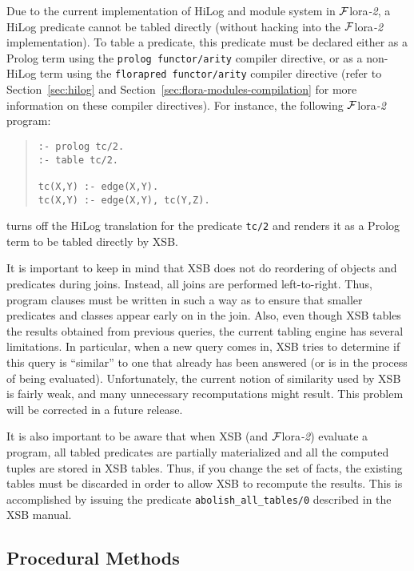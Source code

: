\documentclass[11pt]{article}
\newcommand{\FLORA}{{\mbox{${\cal F}${\sc lora}\rm\emph{-2}}}\xspace}
\begin{document}
%
Due to the current implementation of HiLog and module system in \FLORA,
a HiLog predicate cannot be tabled directly (without hacking into the
\FLORA implementation). To table a predicate, this predicate must be
declared either as a Prolog term using the \mbox{\tt prolog functor/arity}
compiler directive, or as a non-HiLog term using the
\mbox{\tt florapred functor/arity} compiler directive (refer to
Section~\ref{sec:hilog} and Section~\ref{sec:flora-modules-compilation}
for more information on these compiler directives). For instance,
the following \FLORA program:
\begin{quote}
\begin{verbatim}
:- prolog tc/2.
:- table tc/2.

tc(X,Y) :- edge(X,Y).
tc(X,Y) :- edge(X,Y), tc(Y,Z).
\end{verbatim}
\end{quote}
turns off the HiLog translation for the predicate {\tt tc/2} and
renders it as a Prolog term to be tabled directly by XSB.

It is important to keep in mind that XSB does not do reordering of
objects and predicates during joins. Instead, all joins are performed
left-to-right.  Thus, program clauses must be written in such a way as
to ensure that smaller predicates and classes appear early on in the
join. Also, even though XSB tables the results obtained from previous
queries, the current tabling engine has several limitations. In
particular, when a new query comes in, XSB tries to determine if this
query is ``similar'' to one that already has been answered (or is in
the process of being evaluated).  Unfortunately, the current notion of
similarity used by XSB is fairly weak, and many unnecessary
recomputations might result. This problem will be corrected in a
future release.

It is also important to be aware that when XSB (and \FLORA) evaluate a program,
all tabled predicates are partially materialized and all the computed
tuples are stored in XSB tables. Thus, if you change the set of facts, the
existing tables must be discarded in order to allow XSB to recompute the
results. This is accomplished by issuing the predicate
{\tt abolish\_all\_tables/0} described in the XSB manual.


\subsection{Procedural Methods}
\end{document}
